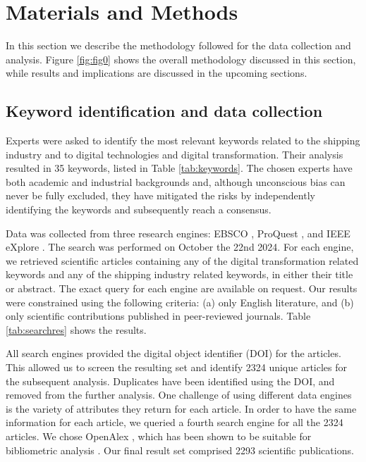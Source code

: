 \documentclass[jmse,review,submit,pdftex,moreauthors]{Definitions/mdpi}
\begin{document}
\section{Materials and Methods}
In this section we describe the methodology followed for the data collection and analysis. Figure \ref{fig:fig0} shows the overall methodology discussed in this section, while results and implications are discussed in the upcoming sections.

\subsection{Keyword identification and data collection}
Experts were asked to identify the most relevant keywords related to the shipping industry and to digital technologies and digital transformation. Their analysis resulted in 35 keywords, listed in Table \ref{tab:keywords}. The chosen experts have both academic and industrial backgrounds and, although unconscious bias can never be fully excluded, they have mitigated the risks by independently identifying the keywords and subsequently reach a consensus.

Data was collected from three research engines: EBSCO \citep{vaughan2011ebsco}, ProQuest \citep{cooke2017proquest}, and IEEE eXplore \citep{wilde2016ieee}. The search was performed on October the 22nd 2024. For each engine, we retrieved scientific articles containing any of the digital transformation related keywords and any of the shipping industry related keywords, in either their title or abstract. The exact query for each engine are available on request. Our results were constrained using the following criteria: (a) only English literature, and (b) only scientific contributions published in peer-reviewed journals. Table \ref{tab:searchres} shows the results.

All search engines provided the digital object identifier (DOI) for the articles. This allowed us to screen the resulting set and identify 2324 unique articles for the subsequent analysis. Duplicates have been identified using the DOI, and removed from the further analysis. One challenge of using different data engines is the variety of attributes they return for each article. In order to have the same information for each article, we queried a fourth search engine for all the 2324 articles. We chose OpenAlex \citep{priem2022openalex}, which has been shown to be suitable for bibliometric analysis \citep{alperin2024analysis}. Our final result set comprised 2293 scientific publications.
\end{document}
